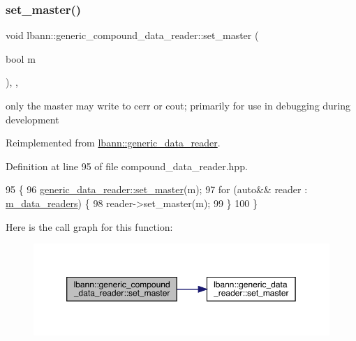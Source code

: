 \subsubsection{\texorpdfstring{set\+\_\+master()}{set\_master()}}
{\footnotesize\ttfamily void lbann\+::generic\+\_\+compound\+\_\+data\+\_\+reader\+::set\+\_\+master (\begin{DoxyParamCaption}\item[{bool}]{m }\end{DoxyParamCaption})\hspace{0.3cm}{\ttfamily [inline]}, {\ttfamily [override]}, {\ttfamily [virtual]}}



only the master may write to cerr or cout; primarily for use in debugging during development 



Reimplemented from \hyperlink{classlbann_1_1generic__data__reader_a343f7d791a04aa1ef30ff829a899e2ae}{lbann\+::generic\+\_\+data\+\_\+reader}.



Definition at line 95 of file compound\+\_\+data\+\_\+reader.\+hpp.


\begin{DoxyCode}
95                                    \{
96     \hyperlink{classlbann_1_1generic__data__reader_a343f7d791a04aa1ef30ff829a899e2ae}{generic\_data\_reader::set\_master}(m);
97     \textcolor{keywordflow}{for} (\textcolor{keyword}{auto}&& reader : \hyperlink{classlbann_1_1generic__compound__data__reader_a9815e94ade5873415fd766e09d956d5b}{m\_data\_readers}) \{
98       reader->set\_master(m);
99     \}
100   \}
\end{DoxyCode}
Here is the call graph for this function\+:\nopagebreak
\begin{figure}[H]
\begin{center}
\leavevmode
\includegraphics[width=350pt]{classlbann_1_1generic__compound__data__reader_ae703ef84ca1c77221f4724a799f9ad0d_cgraph}
\end{center}
\end{figure}
\mbox{\label{classlbann_1_1generic__compound__data__reader_a85860f9ae7e38ae98421219e41b5f829}} 
